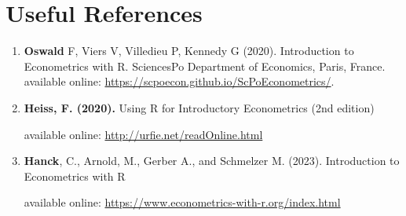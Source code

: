 \documentclass[11pt]{article}
\begin{document}
\section{Useful References}
  \begin{enumerate}
    \item \textbf{Oswald} F, Viers V, Villedieu P, Kennedy G (2020).
Introduction to Econometrics with
R. SciencesPo Department of
Economics, Paris, France. \\
available online: \href{https://scpoecon.github.io/ScPoEconometrics/}{https://scpoecon.github.io/ScPoEconometrics/}.
   \item \textbf{Heiss, F. (2020).} Using R for Introductory Econometrics (2nd edition) 

    available online: \href{http://urfie.net/readOnline.html}{http://urfie.net/readOnline.html}
    \item \textbf{Hanck}, C., Arnold, M., Gerber A., and Schmelzer M. (2023). Introduction to Econometrics with R 

        available online: \href{https://www.econometrics-with-r.org/index.html}{https://www.econometrics-with-r.org/index.html}
  \end{enumerate}
\end{document}
